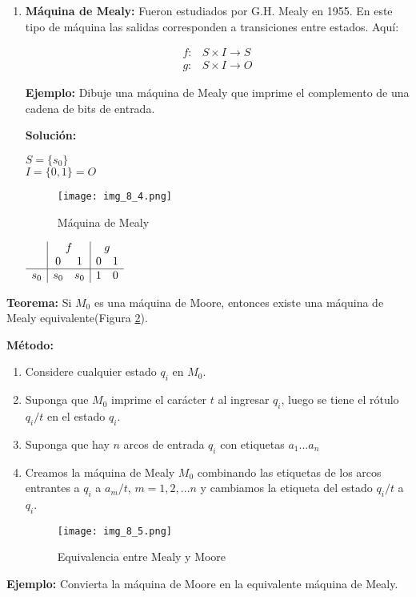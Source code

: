 \begin{enumerate}
\item \textbf{Máquina de Mealy: }Fueron estudiados por G.H. Mealy en 1955. En este tipo de máquina las salidas corresponden a transiciones entre estados. Aquí:

\begin{align*}
f:	&S\times I\rightarrow S	\\
g:	&S\times I\rightarrow O
\end{align*}

\textbf{Ejemplo: }Dibuje una máquina de Mealy que imprime el complemento de una cadena de bits de entrada.

\textbf{Solución: }

$S=\{s_0\}$\\
$I=\{0,1\}=O$

\begin{figure}[h!]
\centering
\texttt{[image: img\_8\_4.png]}
\caption{Máquina de Mealy}\label{img_8_4}
\end{figure}

\begin{center}
$\begin{array}{c|cc|cc}
	&\multicolumn{2}{c|}{f}	&\multicolumn{2}{c}{g}	\\
	&0	&1	&0	&1	\\ \hline
s_0	&s_0&s_0&1	&0
\end{array}$
\end{center}

\end{enumerate}

\textbf{Teorema: }Si $M_0$ es una máquina de Moore, entonces existe una máquina de Mealy equivalente(Figura \ref{img_8_5}).

\textbf{Método:}
\begin{enumerate}
\item Considere cualquier estado $q_i$ en $M_0$.
\item Suponga que $M_0$ imprime el carácter $t$ al ingresar $q_i$, luego se tiene el rótulo $q_i/t$ en el estado $q_i$.
\item Suponga que hay $n$ arcos de entrada $q_i$ con etiquetas $a_1...a_n$
\item Creamos la máquina de Mealy $M_0$ combinando las etiquetas de los arcos entrantes a $q_i$ a $a_m/t$, $m=1,2,...n$ y cambiamos la etiqueta del estado $q_i/t$ a $q_i$.

\begin{figure}[h!]
\centering
\texttt{[image: img\_8\_5.png]}
\caption{Equivalencia entre Mealy y Moore}\label{img_8_5}
\end{figure}
\end{enumerate}
\textbf{Ejemplo: }Convierta la máquina de Moore en la equivalente máquina de Mealy.

